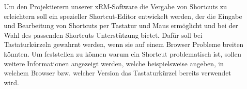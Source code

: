 Um den Projektierern unserer xRM-Software die Vergabe von Shortcuts zu erleichtern soll ein spezieller Shortcut-Editor entwickelt werden, der die Eingabe und Bearbeitung von Shortcuts per Tastatur und Maus ermöglicht und bei der Wahl des passenden Shortcuts Unterstützung bietet.
Dafür soll bei Tastaturkürzeln gewahrnt werden, wenn sie auf einem Browser Probleme breiten könnten.
Um feststellen zu können warum ein Shortcut problematisch ist, sollen weitere Informationen angezeigt werden, welche beispielsweise angeben, in welchem Browser bzw. welcher Version das Tastaturkürzel bereits verwendet wird.
\par
\newpage